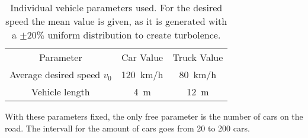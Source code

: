 \begin{table}[b]%
  \caption{\label{tab:individual_parameters}%
    Individual vehicle parameters used. For the desired speed the mean value is given, as it is generated with
    a $\pm 20\%$ uniform distribution to create turbolence.
  }
  \begin{ruledtabular}
    \begin{tabular}{c c c}
      Parameter 
  & Car Value 
  & Truck Value\\
  \colrule
      Average desired speed $v_0$ & \SI{120}{km/h} & \SI{80}{km/h} \\
      Vehicle length & \SI{4}{m} & \SI{12}{m} \\
    \end{tabular}
  \end{ruledtabular}
\end{table}

With these parameters fixed, the only free parameter is the number of cars on the road. The
intervall for the amount of cars goes from 20 to 200 cars.
